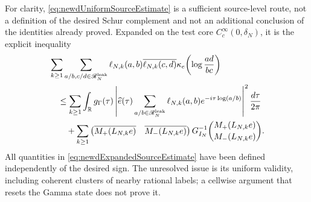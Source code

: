 \documentclass[11pt]{amsart}
\theoremstyle{definition}
\theoremstyle{remark}
\newcommand{\R}{\mathbb R}
\begin{document}
For clarity, \eqref{eq:newdUniformSourceEstimate} is a sufficient
source-level route, not a definition of the desired Schur complement and not
an additional conclusion of the identities already proved.  Expanded on the
test core $C_c^\infty(0,\delta_N)$, it is the explicit inequality
\begin{align}
 &\sum_{k\geq1}
 \sum_{a/b,c/d\in\mathscr R_N^{\rm leak}}
 \ell_{N,k}(a,b)\overline{\ell_{N,k}(c,d)}
 \kappa_e\!\left(\log\frac{ad}{bc}\right)
 \notag\\
 &\quad\leq
 \sum_{k\geq1}\int_\R g_\Gamma(\tau)
 \left|\widehat e(\tau)
   \sum_{a/b\in\mathscr R_N^{\rm leak}}
       \ell_{N,k}(a,b)e^{-i\tau\log(a/b)}\right|^2
 \frac{d\tau}{2\pi}
 \notag\\
 &\qquad+
 \sum_{k\geq1}
 \begin{pmatrix}
  \overline{M_+(L_{N,k}e)}&\overline{M_-(L_{N,k}e)}
 \end{pmatrix}
 G_{I_N}^{-1}
 \binom{M_+(L_{N,k}e)}{M_-(L_{N,k}e)}.
 \label{eq:newdExpandedSourceEstimate}
\end{align}
All quantities in \eqref{eq:newdExpandedSourceEstimate} have been defined
independently of the desired sign.  The unresolved issue is its uniform
validity, including coherent clusters of nearby rational labels; a cellwise
argument that resets the Gamma state does not prove it.
\end{document}
